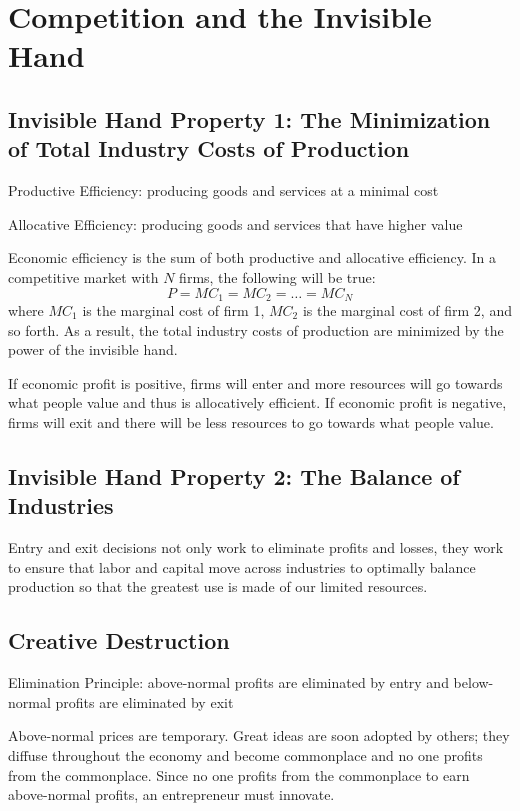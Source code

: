 \documentclass[12pt]{article}
\begin{document}
\section{Competition and the Invisible Hand} 
\subsection{Invisible Hand Property 1: The Minimization of Total Industry Costs of Production}
\begin{definition} Productive Efficiency: producing goods and services at a minimal cost \end{definition} 
\begin{definition} Allocative Efficiency: producing goods and services that have higher value \end{definition} 
Economic efficiency is the sum of both productive and allocative efficiency. 
In a competitive market with $N$ firms, the following will be true: $$ P = MC_1 = MC_2 = \dots = MC_N $$ where $MC_1$ is the marginal cost of firm 1, $MC_2$ is the marginal cost of firm 2, and so forth. As a result, the total industry costs of production are minimized by the power of the invisible hand. 

If economic profit is positive, firms will enter and more resources will go towards what people value and thus is allocatively efficient. If economic profit is negative, firms will exit and there will be less resources to go towards what people value. 

\subsection{Invisible Hand Property 2: The Balance of Industries}
Entry and exit decisions not only work to eliminate profits and losses, they work to ensure that labor and capital move across industries to optimally balance production so that the greatest use is made of our limited resources.

\subsection{Creative Destruction}
\begin{definition} Elimination Principle: above-normal profits are eliminated by entry and below-normal profits are eliminated by exit \end{definition} 
Above-normal prices are temporary. Great ideas are soon adopted by others; they diffuse throughout the economy and become commonplace and no one profits from the commonplace. Since no one profits from the commonplace to earn above-normal profits, an entrepreneur must innovate. 
\end{document}
